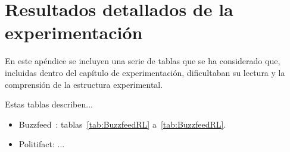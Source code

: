 \chapter{Resultados detallados de la experimentación}\label{anexo-resultados}
\begin{refsection} %

En este apéndice se incluyen una serie de tablas que se ha considerado que, incluidas dentro del capítulo de experimentación, dificultaban su lectura y la comprensión de la estructura experimental.

Estas tablas describen...

\begin{itemize}
    \item Buzzfeed~\cite{BuzzFeedNews}: tablas~\ref{tab:BuzzfeedRL} a~\ref{tab:BuzzfeedRL}.
    \item Politifact: ...
\end{itemize}


\end{refsection}
